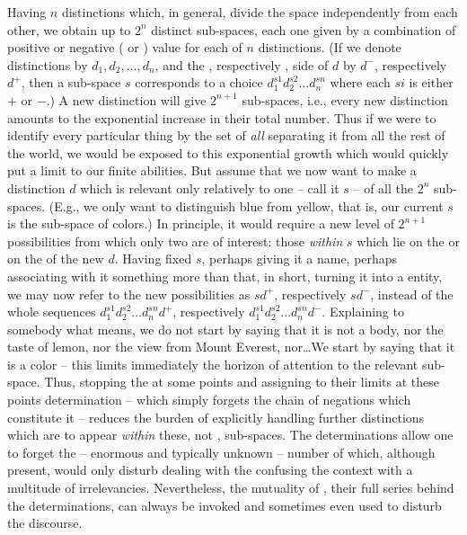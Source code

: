 Having $n$ distinctions which, in general, divide the space independently from
each other, we obtain up to $2^n$ distinct sub-spaces, each one given by a
combination of positive or negative ( or ) value for each
of $n$ distinctions. (If we denote distinctions by
$d_1,d_2,\ldots,d_n$, and the , respectively , side of $d$
by $d^-$, respectively $d^+$, then a sub-space $s$ corresponds to a choice
$d_1^{s1}d_2^{s2}\ldots d_n^{sn}$ where each $si$ is either $+$ or $-$.) A new
distinction will give $2^{n+1}$ sub-spaces, i.e., every new distinction amounts
to the exponential increase in their total number. Thus if we were to identify
every particular thing by the set of {\em all}  separating it
from all the rest of the world, we would be exposed to this exponential growth
which would quickly put a limit to our finite abilities.
But assume that we now want to make a distinction $d$ which is relevant only
relatively to one -- call it $s$ -- of all the $2^n$ sub-spaces. (E.g., we only
want to distinguish blue from yellow, that is, our current $s$ is the sub-space
of colors.) In principle, it would require a new level of $2^{n+1}$
possibilities from which only two are of interest: those {\em within} $s$ which
lie on the  or on the  of the new $d$. Having fixed $s$,
perhaps giving it a name, perhaps associating with it something more than that,
in short, turning it into a  entity, we may now refer to the new
possibilities as $sd^+$, respectively $sd^-$, instead of the whole sequences
$d_1^{s1}d_2^{s2}\ldots d_n^{sn}d^+$, respectively $d_1^{s1}d_2^{s2}\ldots
d_n^{sn}d^-$.  Explaining to somebody what  means, we do not start by
saying that it is not a body, nor the taste of lemon, nor the view from Mount
Everest, nor\ldots We start by saying that it is a color -- this limits
immediately the horizon of attention to the relevant sub-space.  Thus, stopping the
 at some points and assigning to their limits at these points
 determination -- which simply forgets the chain of negations
which constitute it -- reduces the burden of explicitly handling further
{distinctions} which are to appear {\em within} these, not ,
sub-spaces.  The  determinations allow one to forget the --
enormous and typically  unknown -- number of 
which, although present, would only disturb dealing with the 
confusing the context with a multitude of irrelevancies. Nevertheless, the
mutuality of , their full series behind the 
determinations, can always be invoked and sometimes even used to disturb the
discourse.


